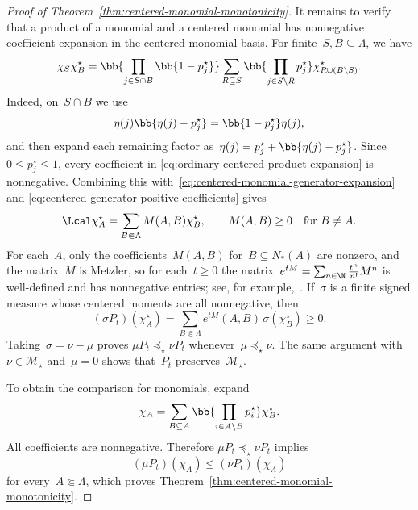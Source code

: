 \begin{proof}[Proof of Theorem~\ref{thm:centered-monomial-monotonicity}]
It remains to verify that a product of a monomial and a centered monomial has nonnegative coefficient expansion in the centered monomial basis. For finite~$S,B\subseteq\Lambda$, we have
\begin{equation}
\label{eq:ordinary-centered-product-expansion}
\chi_S\chi_B^\star
=
\bb{\prod_{j\in S\cap B}\bb{1-p_j^\star}}
\sum_{R\subseteq S}
\bb{\prod_{j\in S\setminus R}p_j^\star}
\chi_{R\cup(B\setminus S)}^\star.
\end{equation}
Indeed, on~$S\cap B$ we use
\begin{equation*}
\eta(j)\bb{\eta(j)-p_j^\star}
=
\bb{1-p_j^\star}\eta(j),
\end{equation*}
and then expand each remaining factor as~$\eta(j)=p_j^\star+\bb{\eta(j)-p_j^\star}$. Since~$0\leq p_j^\star\leq1$, every coefficient in
\eqref{eq:ordinary-centered-product-expansion} is nonnegative. Combining this
with~\eqref{eq:centered-monomial-generator-expansion} and
\eqref{eq:centered-generator-positive-coefficients} gives
\begin{equation}
\label{eq:centered-generator-metzler}
\Lcal\chi_A^\star
=
\sum_{B\Subset\Lambda}M(A,B)\chi_B^\star,
\qquad
M(A,B)\geq0
\quad\text{for }B\neq A.
\end{equation}
For each~$A$, only the coefficients~$M(A,B)$ for~$B\subseteq N_*(A)$ are nonzero, and the matrix~$M$ is Metzler, so for each~$t\geq0$ the matrix~$e^{tM}=\sum_{n\in\N}\frac{t^n}{n!}M^n$ is well-defined and has nonnegative entries; see, for example,~\cite{ArendtEtAl1986}. If~$\sigma$ is a
finite signed measure whose centered moments are all nonnegative, then
\begin{equation*}
(\sigma P_t)(\chi_A^\star)
=
\sum_{B\Subset \Lambda}
e^{tM}(A,B)\,\sigma(\chi_B^\star)
\geq0.
\end{equation*}
Taking~$\sigma=\nu-\mu$ proves
$\mu P_t\preceq_\star\nu P_t$ whenever~$\mu\preceq_\star\nu$. The same argument with~$\nu\in\mathcal M_\star$ and~$\mu = 0$ shows that~$P_t$ preserves~$\mathcal M_\star$.

 To obtain the comparison for
monomials, expand
\begin{equation*}
\chi_A
=
\sum_{B\subseteq A}
\bb{\prod_{i\in A\setminus B}p_i^\star}
\chi_B^\star.
\end{equation*}
All coefficients are nonnegative. Therefore
$\mu P_t\preceq_\star\nu P_t$ implies
\begin{equation*}
(\mu P_t)(\chi_A)
\leq
(\nu P_t)(\chi_A)
\end{equation*}
for every~$A\Subset\Lambda$, which proves
Theorem~\ref{thm:centered-monomial-monotonicity}.
\end{proof}

